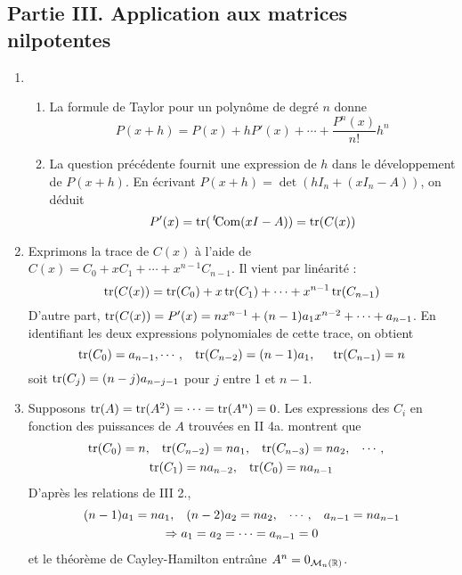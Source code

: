 \subsection*{Partie III. Application aux matrices nilpotentes}
\begin{enumerate}
\item
  \begin{enumerate}
  \item La formule de Taylor pour un polyn{\^o}me de degr{\'e} $n$ donne
\[P(x+h)=P(x)+ hP'(x)+\cdots + \frac{P^{n}(x)}{n!}h^n\]
  \item La question pr{\'e}c{\'e}dente fournit une expression de $h$ dans le d{\'e}veloppement de $P(x+h)$. En {\'e}crivant $P(x+h)=\det \left (hI_n+(xI_n-A)\right )$, on d{\'e}duit
\[P'(x)=\operatorname{tr}(\,\mathstrut^t\!\mathrm{Com}(xI-A))=\operatorname{tr}(C(x))\]
  \end{enumerate}
\item Exprimons la trace de $C(x)$ {\`a} l'aide de $C(x)=C_0+xC_1+\cdots+x^{n-1}C_{n-1}$. Il vient par lin{\'e}arit{\'e} :
\begin{displaymath}
\operatorname{tr}(C(x))=\operatorname{tr}(C_0) + x\operatorname{tr}(C_1) + \cdots + x^{n-1}\operatorname{tr}(C_{n-1})  
\end{displaymath}
D'autre part, $\operatorname{tr}(C(x)) = P'(x) = nx^{n-1} + (n-1)a_1 x^{n-2} + \cdots + a_{n-1}$. En identifiant les deux expressions polynomiales de cette trace, on obtient
\begin{displaymath}
\operatorname{tr}(C_0) = a_{n-1},\cdots,\hspace{0.3cm}\operatorname{tr}(C_{n-2}) = (n-1)a_1,\hspace{0.5cm} \operatorname{tr}(C_{n-1}) = n  
\end{displaymath}
soit $\operatorname{tr}(C_j) = (n-j)a_{n-j-1}$ pour $j$ entre 1 et $n-1$.
\item Supposons
  $\operatorname{tr}(A) = \operatorname{tr}(A^2) = \cdots = \operatorname{tr}(A^n) = 0$. Les expressions des $C_i$ en fonction des puissances de $A$ trouv{\'e}es en II 4a. montrent que
\begin{multline*}
\operatorname{tr}(C_{0}) = n,\hspace{0.3cm}\operatorname{tr}(C_{n-2}) = na_1,\hspace{0.3cm} \operatorname{tr}(C_{n-3}) = na_2,\hspace{0.3cm} \cdots,\hspace{0.3cm}\\
\operatorname{tr}(C_{1}) = na_{n-2},\hspace{0.3cm} \operatorname{tr}(C_{0}) = na_{n-1}  
\end{multline*}
D'apr{\`e}s les relations de III 2.,
\begin{multline*}
(n-1)a_1 = na_1,\hspace{0.3cm} (n-2)a_2 = na_2,\hspace{0.3cm} \cdots,\hspace{0.3cm} a_{n-1} = na_{n-1} \\
\Rightarrow a_1 = a_2 = \cdots = a_{n-1} = 0
\end{multline*}
et le th{\'e}or{\`e}me de Cayley-Hamilton entra{\^\i}ne $A^n = 0_{\mathcal{M}_n(\mathbb{R})}$.
\end{enumerate}
